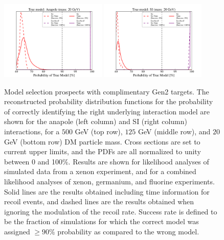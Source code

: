 \documentclass[11pt]{article}
\begin{document}
\begin{figure}
\includegraphics[width=0.45\textwidth]{plots/PDF_Single_20GeV_Anapole_50sims_Xe_vs_FGeXe_GF_TNT.pdf}
\includegraphics[width=0.45\textwidth]{plots/PDF_Single_20GeV_SI_Higgs_50sims_Xe_vs_FGeXe_GF_TNT.pdf}
\caption{\label{fig:gen2}
Model selection prospects with complimentary Gen2 targets. The reconstructed probability distribution functions for the probability of correctly identifying the right underlying interaction model are shown for the anapole (left column) and SI (right column) interactions, for a $500$ GeV (top row), $125$ GeV (middle row), and $20$ GeV (bottom row) DM particle mass. Cross sections are set to current upper limits, and the PDFs are all normalized to unity between 0 and 100$\%$. Results are shown for likelihood analyses of simulated data from a xenon experiment, and for a combined likelihood analyses of xenon, germanium, and fluorine experiments. Solid lines are the results obtained including time information for recoil events, and dashed lines are the results obtained when ignoring the modulation of the recoil rate. Success rate is defined to be the fraction of simulations for which the correct model was assigned $ \geq 90\%$ probability as compared to the wrong model.}
\end{figure}
\end{document}
